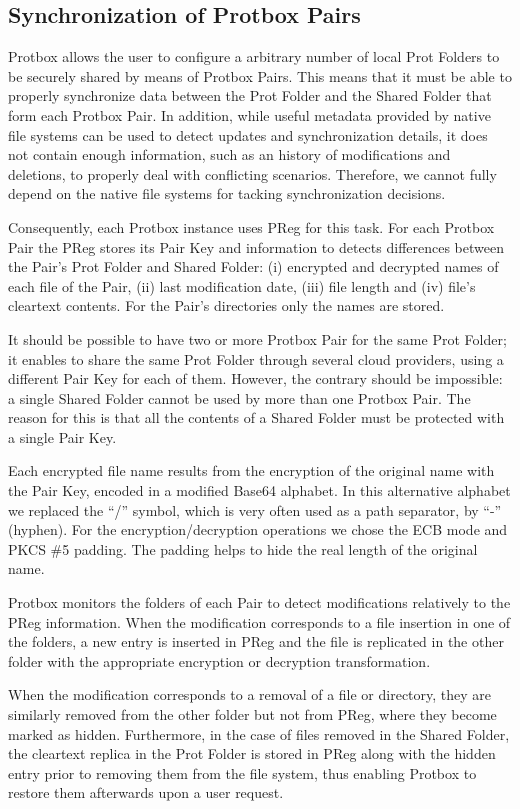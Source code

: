 \documentclass[english]{lni}
\newcommand\protbox{Protbox}
\newcommand\ProtF{Prot Folder}
\newcommand\ProtFs{Prot Folders}
\newcommand\SharedF{Shared Folder}
\newcommand\PairKey{Pair Key}
\newcommand\PPair{{\protbox} Pair}
\newcommand\PPairs{{\protbox} Pairs}
\begin{document}
\subsection{Synchronization of {\PPairs}}

{\protbox} allows the user to configure a arbitrary number of local
{\ProtFs} to be securely shared by means of {\PPairs}.
This means that it must be able to properly synchronize data between
the {\ProtF} and the {\SharedF} that form each {\protbox}
Pair. In addition, while useful metadata provided by native file
systems can be used to detect updates and synchronization details,
it does not contain enough information, such as an history of
modifications and deletions, to properly deal with conflicting
scenarios. Therefore, we cannot fully depend on the native file
systems for tacking synchronization decisions.

Consequently, each {\protbox} instance uses PReg
for this task. For each {\PPair} the PReg stores its Pair
Key and information to detects differences between
the Pair's {\ProtF} and {\SharedF}: (i) encrypted and
decrypted names of each file of the Pair, (ii) last
modification date, (iii) file length and (iv) file's cleartext
contents. For the Pair's directories only the names are stored.

It should be possible to have two or more {\PPair} for the
same {\ProtF}; it enables to share the same {\ProtF} through
several cloud providers, using a different {\PairKey} for each of
them. However, the contrary should be impossible: a single {\SharedF}
cannot be used by more than one {\PPair}. The reason
for this is that all the contents of a {\SharedF} must be
protected with a single {\PairKey}.

Each encrypted file name results from the encryption of the original
name with the {\PairKey}, encoded in a modified Base64 alphabet. In
this alternative alphabet we replaced the ``/'' symbol, which is
very often used as a path separator, by ``-'' (hyphen). For the
encryption/decryption operations we chose the 
ECB mode 
and PKCS \#5 padding. The padding helps
to hide the real length of the original name.

{\protbox} monitors the folders of each Pair to detect
modifications relatively to the PReg information. When the
modification corresponds to a file insertion in one of the folders,
a new entry is inserted in PReg and the file is replicated in the
other folder with the appropriate encryption or decryption
transformation.

When the modification corresponds to a removal of a file or
directory, they are similarly removed from the other folder but not
from PReg, where they become marked as hidden. Furthermore, in the
case of files removed in the {\SharedF}, the cleartext replica in
the {\ProtF} is stored in PReg along with the hidden entry prior
to removing them from the file system, thus enabling {\protbox} to
restore them afterwards upon a user request.
\end{document}
